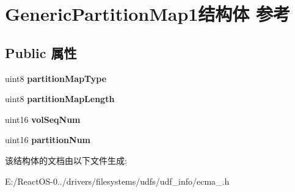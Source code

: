 \hypertarget{struct_generic_partition_map1}{}\section{Generic\+Partition\+Map1结构体 参考}
\label{struct_generic_partition_map1}
\subsection*{Public 属性}
\begin{DoxyCompactItemize}
\item 
\mbox{\label{struct_generic_partition_map1_a4f69e37298393eff1603651993de3121}} 
uint8 {\bfseries partition\+Map\+Type}
\item 
\mbox{\label{struct_generic_partition_map1_a9a5d38dfad3aef4d8dbdbc6e55b64464}} 
uint8 {\bfseries partition\+Map\+Length}
\item 
\mbox{\label{struct_generic_partition_map1_a949204378fa1c2beecc27346630075ee}} 
uint16 {\bfseries vol\+Seq\+Num}
\item 
\mbox{\label{struct_generic_partition_map1_a532421abffc4081887439442c238491b}} 
uint16 {\bfseries partition\+Num}
\end{DoxyCompactItemize}


该结构体的文档由以下文件生成\+:\begin{DoxyCompactItemize}
\item 
E\+:/\+React\+O\+S-\/0../drivers/filesystems/udfs/udf\+\_\+info/ecma\+\_.\+h\end{DoxyCompactItemize}
